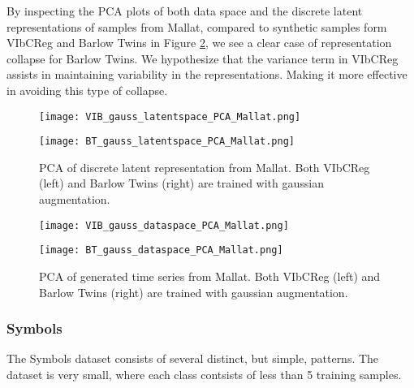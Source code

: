 \documentclass[../../thesis.tex]{subfiles}
\begin{document}
By inspecting the PCA plots of both data space and the discrete latent representations of samples from Mallat, compared to synthetic samples form VIbCReg and Barlow Twins in Figure \ref{fig:Mallat_data_PCA}, we see a clear case of representation collapse for Barlow Twins. We hypothesize that the variance term in VIbCReg assists in maintaining variability in the representations. Making it more effective in avoiding this type of collapse. 

\begin{figure}[h]
    \centering
    \begin{minipage}[b]{0.40\textwidth}
        \centering
        \texttt{[image: VIB\_gauss\_latentspace\_PCA\_Mallat.png]}
    \end{minipage}
    \begin{minipage}[b]{0.40\textwidth}
        \centering
        \texttt{[image: BT\_gauss\_latentspace\_PCA\_Mallat.png]}
    \end{minipage}
    \caption{PCA of discrete latent representation from Mallat. Both VIbCReg (left) and Barlow Twins (right) are trained with gaussian augmentation.}
    \label{fig:Mallat_latent_PCA}
\end{figure}

\begin{figure}[h]
    \centering
    \begin{minipage}[b]{0.40\textwidth}
        \centering
        \texttt{[image: VIB\_gauss\_dataspace\_PCA\_Mallat.png]}
    \end{minipage}
    \begin{minipage}[b]{0.40\textwidth}
        \centering
        \texttt{[image: BT\_gauss\_dataspace\_PCA\_Mallat.png]}
    \end{minipage}
    \caption{PCA of generated time series from Mallat. Both VIbCReg (left) and Barlow Twins (right) are trained with gaussian augmentation.}
    \label{fig:Mallat_data_PCA}
\end{figure}




\subsubsection{Symbols}

The Symbols dataset consists of several distinct, but simple, patterns. The dataset is very small, where each class contsists of less than 5 training samples.\newline
\end{document}

